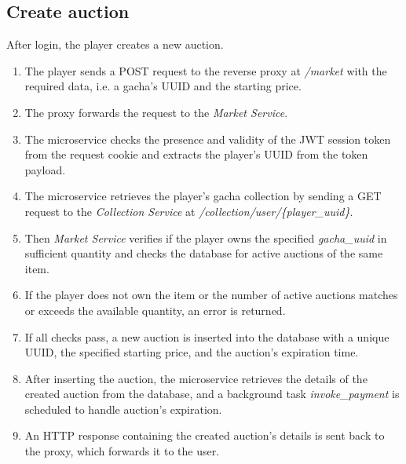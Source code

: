 \documentclass{article}
\begin{document}
\subsection{Create auction}
After login, the player creates a new auction.
\begin{enumerate}
    \item The player sends a POST request to the reverse proxy at \emph{/market} with the required data, i.e. a gacha's UUID and the starting price.
    \item The proxy forwards the request to the \emph{Market Service}.
    \item The microservice checks the presence and validity of the JWT session token from the request cookie and extracts the player's UUID from the token payload.
    \item The microservice retrieves the player's gacha collection by sending a GET request to the \emph{Collection Service} at \emph{/collection/user/\{player\_uuid\}}.
    \item Then \emph{Market Service} verifies if the player owns the specified \emph{gacha\_uuid} in sufficient quantity and checks the database for active auctions of the same item.
    \item If the player does not own the item or the number of active auctions matches or exceeds the available quantity, an error is returned.
    \item If all checks pass, a new auction is inserted into the database with a unique UUID, the specified starting price, and the auction's expiration time.
    \item After inserting the auction, the microservice retrieves the details of the created auction from the database, and a background task \emph{invoke\_payment} is scheduled to handle auction's expiration.
    \item An HTTP response containing the created auction's details is sent back to the proxy, which forwards it to the user.
\end{enumerate}
\end{document}
